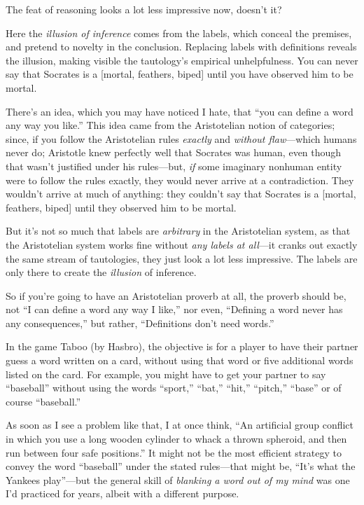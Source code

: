 {{{
 The feat of reasoning looks a lot less impressive now,
doesn't it?}

{
 Here the \textit{illusion of inference} comes from the labels,
which conceal the premises, and pretend to novelty in the conclusion.
Replacing labels with definitions reveals the illusion, making visible
the tautology's empirical unhelpfulness. You can never
say that Socrates is a [mortal, {\textlnot}feathers, biped] until you
have observed him to be mortal.}

{
 There's an idea, which you may have noticed I
hate, that ``you can define a word any way you
like.'' This idea came from the Aristotelian notion
of categories; since, if you follow the Aristotelian rules
\textit{exactly} and \textit{without flaw}{}---which humans never do;
Aristotle knew perfectly well that Socrates was human, even though that
wasn't justified under his rules---but, \textit{if}
some imaginary nonhuman entity were to follow the rules exactly, they
would never arrive at a contradiction. They wouldn't
arrive at much of anything: they couldn't say that
Socrates is a [mortal, {\textlnot}feathers, biped] until they observed
him to be mortal.}

{
 But it's not so much that labels are
\textit{arbitrary} in the Aristotelian system, as that the Aristotelian
system works fine without \textit{any labels at all}{}---it cranks out
exactly the same stream of tautologies, they just look a lot less
impressive. The labels are only there to create the \textit{illusion}
of inference.}

{
 So if you're going to have an Aristotelian proverb
at all, the proverb should be, not ``I can define a
word any way I like,'' nor even,
``Defining a word never has any
consequences,'' but rather,
``Definitions don't need
words.''}

\myendsectiontext


{
 In the game Taboo (by Hasbro), the objective is for a player to
have their partner guess a word written on a card, without using that
word or five additional words listed on the card. For example, you
might have to get your partner to say
``baseball'' without using the words
``sport,''
``bat,''
``hit,''
``pitch,''
``base'' or of course
``baseball.'' }

{
 As soon as I see a problem like that, I at once think,
``An artificial group conflict in which you use a long
wooden cylinder to whack a thrown spheroid, and then run between four
safe positions.'' It might not be the most efficient
strategy to convey the word
``baseball'' under the stated
rules---that might be, ``It's what the
Yankees play''---but the general skill of
\textit{blanking a word out of my mind} was one I'd
practiced for years, albeit with a different purpose.}

}}
